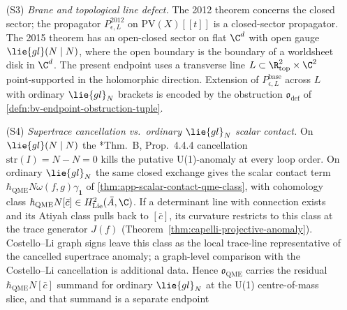 \begin{prop}
\begin{enumerate}
      \(\C^2\).  The two complexes have distinct generators and
      differentials, so transfer of a Costello--Li class on
      \((\mathrm{PV}(X)[[t]],Q_{\mathrm{BCOV}})\) to a cocycle of
      a mixed-complex BV Laplacian \(\Delta_{\mathrm{mix}}\) requires
      both the supplied mixed BV operator and a kinematic comparison
      map.  The protected sector of twisted
      M-theory \cite{costello-twistedM} carries this mixed kinematic
      shape as physical motivation.
    \item[(S3)] \emph{Brane and topological line defect.}  The 2012
      theorem concerns the closed sector; the propagator
      \(P^{\mathrm{2012}}_{\epsilon,L}\) on \(\mathrm{PV}(X)[[t]]\)
      is a closed-sector propagator.  The 2015
      theorem has an open-closed sector on flat \(\C^d\) with open gauge
      \(\lie{gl}(N\mid N)\), where the open boundary is the boundary of a
      worldsheet disk in \(\C^d\).  The present endpoint uses a transverse
      line \(L\subset\R^2_{\mathrm{top}}\times\C^2\) point-supported in the
      holomorphic direction.  Extension of
      \(P^{\mathrm{base}}_{\epsilon,L}\) across \(L\) with ordinary
      \(\lie{gl}_N\) brackets is encoded by the obstruction
      \(\mathfrak o_{\mathrm{def}}\) of
      \ref{defn:bv-endpoint-obstruction-tuple}.
    \item[(S4)] \emph{Supertrace cancellation vs.\ ordinary
      \(\lie{gl}_N\) scalar contact.}  On \(\lie{gl}(N\mid N)\) the
      \cite{costello-li-open-closed-bcov}*{Thm.~B, Prop.~4.4.4} cancellation
      \(\mathrm{str}(I)=N-N=0\) kills the putative U(1)-anomaly at
      every loop order.  On ordinary \(\lie{gl}_N\) the same closed
      exchange gives the scalar contact term
      \(\hbar_{\mathrm{QME}} N\omega(f,g)\gamma_{\mathbf 1}\) of
      \ref{thm:app-scalar-contact-qme-class}, with cohomology class
      \(\hbar_{\mathrm{QME}} N[\bar c]\in H^2_{\mathrm{Lie}}(\bar A,\C)\).  If a
      determinant line with connection exists and its Atiyah
      class pulls back to \([\bar c]\), its curvature restricts to
      this class at the trace generator \(J(f)\)
      (Theorem~\ref{thm:capelli-projective-anomaly}).
      Costello--Li graph signs leave this class as the
      local trace-line representative of the cancelled supertrace anomaly; a
      graph-level comparison with the Costello--Li cancellation is
      additional data.  Hence
      \(\mathfrak o_{\mathrm{QME}}\) carries the residual
      \(\hbar_{\mathrm{QME}} N[\bar c]\) summand for ordinary \(\lie{gl}_N\) at the
      U(1) centre-of-mass slice, and that summand is a separate endpoint

\end{enumerate}
\end{prop}
